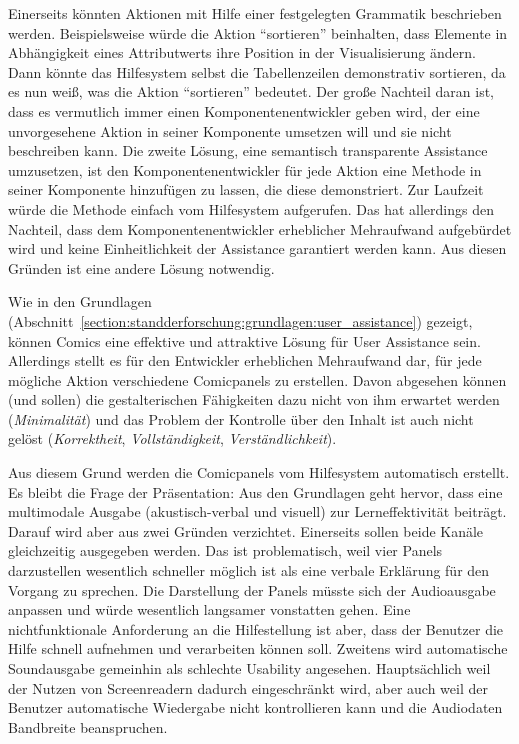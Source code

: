 \documentclass[
	headsepline,
	footsepline,
	fontsize=12pt,
	bibliography=totoc
]{scrbook}
\begin{document}
Einerseits könnten Aktionen mit Hilfe einer festgelegten Grammatik beschrieben werden. Beispielsweise würde die Aktion \enquote{sortieren} beinhalten, dass Elemente in Abhängigkeit eines Attributwerts ihre Position in der Visualisierung ändern. Dann könnte das Hilfesystem selbst die Tabellenzeilen demonstrativ sortieren, da es nun weiß, was die Aktion \enquote{sortieren} bedeutet. Der große Nachteil daran ist, dass es vermutlich immer einen Komponentenentwickler geben wird, der eine unvorgesehene Aktion in seiner Komponente umsetzen will und sie nicht beschreiben kann. Die zweite Lösung, eine semantisch transparente Assistance umzusetzen, ist den Komponentenentwickler für jede Aktion eine Methode in seiner Komponente hinzufügen zu lassen, die diese demonstriert. Zur Laufzeit würde die Methode einfach vom Hilfesystem aufgerufen. Das hat allerdings den Nachteil, dass dem Komponentenentwickler erheblicher Mehraufwand aufgebürdet wird und keine Einheitlichkeit der Assistance garantiert werden kann. Aus diesen Gründen ist eine andere Lösung notwendig.

Wie in den Grundlagen (Abschnitt~\ref{section:standderforschung:grundlagen:user_assistance}) gezeigt, können Comics eine effektive und attraktive Lösung für User Assistance sein. Allerdings stellt es für den Entwickler erheblichen Mehraufwand dar, für jede mögliche Aktion verschiedene Comicpanels zu erstellen. Davon abgesehen können (und sollen) die gestalterischen Fähigkeiten dazu nicht von ihm erwartet werden (\emph{Minimalität}) und das Problem der Kontrolle über den Inhalt ist auch nicht gelöst (\emph{Korrektheit}, \emph{Vollständigkeit}, \emph{Verständlichkeit}).

Aus diesem Grund werden die Comicpanels vom Hilfesystem automatisch erstellt. Es bleibt die Frage der Präsentation: Aus den Grundlagen geht hervor, dass eine multimodale Ausgabe (akustisch-verbal und visuell) zur Lerneffektivität beiträgt. Darauf wird aber aus zwei Gründen verzichtet. Einerseits sollen beide Kanäle gleichzeitig ausgegeben werden. Das ist problematisch, weil vier Panels darzustellen wesentlich schneller möglich ist als eine verbale Erklärung für den Vorgang zu sprechen. Die Darstellung der Panels müsste sich der Audioausgabe anpassen und würde wesentlich langsamer vonstatten gehen. Eine nichtfunktionale Anforderung an die Hilfestellung ist aber, dass der Benutzer die Hilfe schnell aufnehmen und verarbeiten können soll. Zweitens wird automatische Soundausgabe gemeinhin als schlechte Usability angesehen. Hauptsächlich weil der Nutzen von Screenreadern dadurch eingeschränkt wird, aber auch weil der Benutzer automatische Wiedergabe nicht kontrollieren kann und die Audiodaten Bandbreite beanspruchen.
\end{document}
